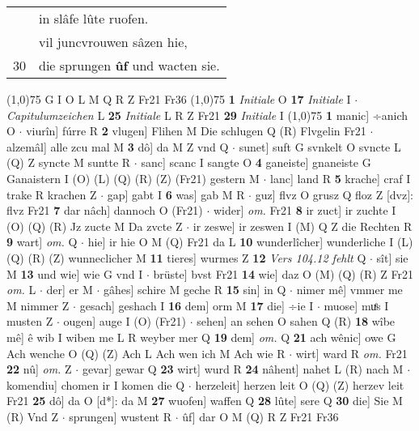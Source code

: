 \documentclass[8pt,a4paper,notitlepage]{article}
\begin{document}
\begin{table}[ht]
\begin{minipage}[t]{0.5\linewidth}
\begin{tabular}{rl}
 & in slâfe lûte ruofen.\\ 
 & vil juncvrouwen sâzen hie,\\ 
30 & die sprungen \textbf{ûf} und wacten sie.\\ 
\end{tabular}
\scriptsize
\line(1,0){75} \newline
G I O L M Q R Z Fr21 Fr36 \newline
\line(1,0){75} \newline
\textbf{1} \textit{Initiale} O  \textbf{17} \textit{Initiale} I   $\cdot$ \textit{Capitulumzeichen} L  \textbf{25} \textit{Initiale} L R Z Fr21  \textbf{29} \textit{Initiale} I  \newline
\line(1,0){75} \newline
\textbf{1} manic] ÷anich O  $\cdot$ viurîn] fúrre R \textbf{2} vlugen] Flihen M Die schlugen Q (R) Flvgelin Fr21  $\cdot$ alzemâl] alle zcu mal M \textbf{3} dô] da M Z vnd Q  $\cdot$ sunet] suft G svnkelt O svncte L (Q) Z syncte M suntte R  $\cdot$ sanc] scanc I sangte O \textbf{4} ganeiste] gnaneiste G Ganaistern I (O) (L) (Q) (R) (Z) (Fr21) gestern M  $\cdot$ lanc] land R \textbf{5} krache] craf I trake R krachen Z  $\cdot$ gap] gabt I \textbf{6} was] gab M R  $\cdot$ guz] flvz O grusz Q floz Z [dvz]: flvz Fr21 \textbf{7} dar nâch] dannoch O (Fr21)  $\cdot$ wider] \textit{om.} Fr21 \textbf{8} ir zuct] ir zuchte I (O) (Q) (R) Jz zucte M Da zvcte Z  $\cdot$ ir zeswe] ir zeswen I (M) Q Z die Rechten R \textbf{9} wart] \textit{om.} Q  $\cdot$ hie] ir hie O M (Q) Fr21 da L \textbf{10} wunderlîcher] wunderliche I (L) (Q) (R) (Z) wunneclicher M \textbf{11} tieres] wurmes Z \textbf{12} \textit{Vers 104.12 fehlt} Q   $\cdot$ sît] sie M \textbf{13} und wie] wie G vnd I  $\cdot$ brüste] bvst Fr21 \textbf{14} wie] daz O (M) (Q) (R) Z Fr21 \textit{om.} L  $\cdot$ der] er M  $\cdot$ gâhes] schire M geche R \textbf{15} sin] in Q  $\cdot$ nimer mê] vmmer me M nimmer Z  $\cdot$ gesach] geshach I \textbf{16} dem] orm M \textbf{17} die] ÷ie I  $\cdot$ muose] muͤs I musten Z  $\cdot$ ougen] auge I (O) (Fr21)  $\cdot$ sehen] an sehen O sahen Q (R) \textbf{18} wîbe mê] ê wib I wiben me L R weyber mer Q \textbf{19} dem] \textit{om.} Q \textbf{21} ach wênic] owe G Ach wenche O (Q) (Z) Ach L Ach wen ich M Ach wie R  $\cdot$ wirt] ward R \textit{om.} Fr21 \textbf{22} nû] \textit{om.} Z  $\cdot$ gevar] gewar Q \textbf{23} wirt] wurd R \textbf{24} nâhent] nahet L (R) nach M  $\cdot$ komendiu] chomen ir I komen die Q  $\cdot$ herzeleit] herzen leit O (Q) (Z) herzev leit Fr21 \textbf{25} dô] da O [d*]: da M \textbf{27} wuofen] waffen Q \textbf{28} lûte] sere Q \textbf{30} die] Sie M (R) Vnd Z  $\cdot$ sprungen] wustent R  $\cdot$ ûf] dar O M (Q) R Z Fr21 Fr36 \newline

\end{minipage}
\end{table}
\end{document}
